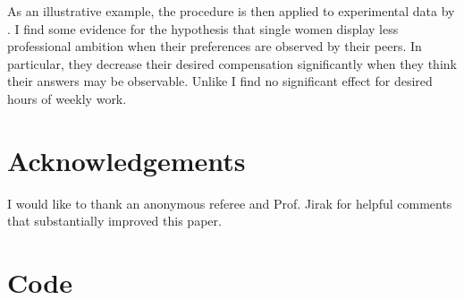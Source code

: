 \documentclass[aodsor,preprint]{imsart}
\numberwithin{equation}{section}
\theoremstyle{plain}
\begin{document}
As an illustrative example, the procedure is then applied to experimental data by \cite{Bursztyn_2017}. I find some evidence for the hypothesis that single women display less professional ambition when their preferences are observed by their peers. In particular, they decrease their desired compensation significantly when they think their answers may be observable. Unlike \cite{Bursztyn_2017} I find no significant effect for desired hours of weekly work. 


\section*{Acknowledgements}

I would like to thank an anonymous referee and Prof. Jirak for helpful comments that substantially improved this paper.




\newpage

\appendix
\section{Code} \label{Code}
\end{document}
